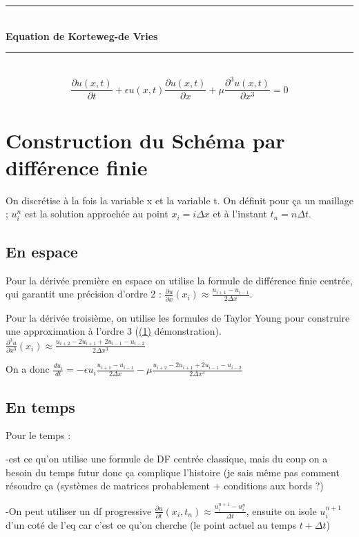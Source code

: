 \documentclass[12pt,a4paper]{article}
\begin{document}
\begin{center}
    \rule{\linewidth}{0.5pt} \\
    \Large \textbf{Equation de Korteweg-de Vries} \\
    \rule{\linewidth}{0.5pt} \\
    \vspace{0.5cm}
    \[ \frac{\partial u(x,t)}{\partial t}+\epsilon u(x,t)\frac{\partial u(x,t)}{\partial x}+\mu\frac{\partial^{3}u(x,t)}{\partial x^{3}}=0 \]
\end{center}


\section{Construction du Schéma par différence finie}


On discrétise à la fois la variable x et la variable t. On définit pour ça un maillage ;  $u_i^n$ est la solution approchée au point $x_i = i\Delta x$ et à l'instant $t_n = n\Delta t$. 

\subsection{En espace}
Pour la dérivée première en espace on utilise la formule de différence finie centrée, qui garantit une précision d'ordre 2 : $\frac{\partial u}{\partial x}(x_i) \approx \frac{u_{i+1} - u_{i-1}}{2\Delta x}$. 

Pour la dérivée troisième, on utilise les formules de Taylor Young pour construire une approximation à l'ordre 3 (\hyperref[annexe:demo1]{(1)} démonstration). 
$\frac{\partial^3 u}{\partial x^3}(x_i) \approx \frac{u_{i+2} - 2u_{i+1} + 2u_{i-1} - u_{i-2}}{2\Delta x^3}$

On a donc $\frac{d u_i}{dt} = - \epsilon u_i \frac{u_{i+1} - u_{i-1}}{2\Delta x} - \mu \frac{u_{i+2} - 2u_{i+1} + 2u_{i-1} - u_{i-2}}{2\Delta x^3}$

\subsection{En temps}

Pour le temps : 

-est ce qu'on utilise une formule de DF centrée classique, mais du coup on a besoin du temps futur donc ça complique l'histoire (je sais même pas comment résoudre ça (systèmes de matrices probablement + conditions aux bords ?)

-On peut utiliser un df progressive $\frac{\partial u}{\partial t}(x_i, t_n) \approx \frac{u_i^{n+1} - u_i^n}{\Delta t}$, ensuite on isole $u_i^{n+1}$ d'un coté de l'eq car c'est ce qu'on cherche (le point actuel au temps $t+\Delta t$)
\end{document}

